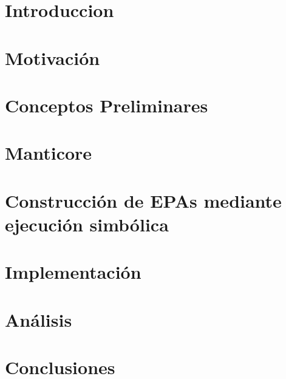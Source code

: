 \documentclass[11pt,a4paper,twoside]{tesis}
\theoremstyle{definition}
\begin{document}

\def\autor{Daniel Wappner}
\def\tituloTesis{Construcción de Enabledness Preserving Abstractions para smart contracts mediante ejecución simbólica}
\def\runtitulo{Construcción de Enabledness Preserving Abstractions para Smart Contracts mediante ejecución simbólica}
\def\runtitle{Construcción de Enabledness Preserving Abstractions para smart contracts mediante ejecución simbólica}
\def\codirector{Diego David Garbervetsky}
\def\director{Javier Godoy}
\def\lugar{Buenos Aires, 2024}


\frontmatter
\pagestyle{empty}





\cleardoublepage
\tableofcontents

\mainmatter
\pagestyle{headings}


\chapter{Introduccion}


\chapter{Motivación}


\chapter{Conceptos Preliminares}


\chapter{Manticore}


\chapter{Construcción de EPAs mediante ejecución simbólica}


\chapter{Implementación}


\chapter{Análisis}


\chapter{Conclusiones}


\backmatter
\printbibliography
\end{document}
